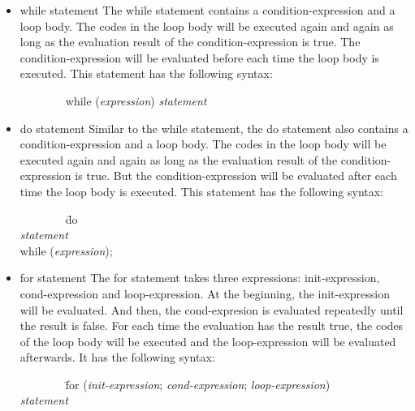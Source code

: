 \documentclass[12pt,psfig,a4]{article}
\begin{document}
\begin{itemize}
\item while statement
The while statement contains a condition-expression and a loop body. The codes in the loop body will be executed again and again as long as the evaluation result of the condition-expression is true. The condition-expression will be evaluated before each time the loop body is executed. This statement has the following syntax:

\begin{code}
\begin{tabbing}
~~~~~~~~while (\textsl{expression}) \textsl{statement}
\end{tabbing}
\end{code}

\item do statement
Similar to the while statement, the do statement also contains a condition-expression and a loop body. The codes in the loop body will be executed again and again as long as the evaluation result of the condition-expression is true. But the condition-expression will be evaluated after each time the loop body is executed. This statement has the following syntax:

\begin{code}
\begin{tabbing}
~~~~~~~~\= do \= \\
\> \> \textsl{statement} \\
\> while (\textsl{expression});
\end{tabbing}
\end{code}

\item for statement
The for statement takes three expressions: init-expression, cond-expression and loop-expression. At the beginning, the init-expression will be evaluated. And then, the cond-expresion is evaluated repeatedly until the result is false. For each time the evaluation has the result true, the codes of the loop body will be executed and the loop-expression will be evaluated afterwards. It has the following syntax:

\begin{code}
\begin{tabbing}
~~~~~~~~\= for (\= \textsl{init-expression}; \textsl{cond-expression}; \textsl{loop-expression}) \\
\> \> \textsl{statement}
\end{tabbing}
\end{code}


\end{itemize}
\end{document}
